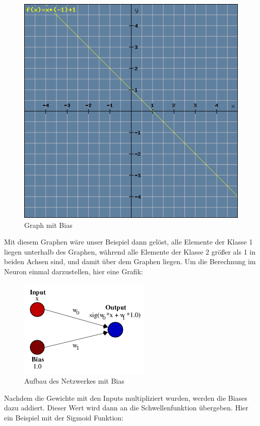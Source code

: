 \documentclass[12pt]{article}
\begin{document}
\begin{figure}[H]
\centering
\includegraphics[scale=0.60]{./Images/Pasted image 20231005144628.png}
\caption{Graph mit Bias}
\label{Graph mit Bias}
\end{figure}
Mit diesem Graphen wäre unser Beispiel dann gelöst, alle Elemente der Klasse 1 liegen unterhalb des Graphen, während alle Elemente der Klasse 2 größer als 1 in beiden Achsen sind, und damit über dem Graphen liegen.
Um die Berechnung im Neuron einmal darzustellen, hier eine Grafik:
\begin{figure}[H]
\centering
\includegraphics[scale=0.60]{./Images/Pasted image 20231005133406.png}
\caption{Aufbau des Netzwerkes mit Bias}
\label{Aufbau des Netzwerkes mit Bias}
\end{figure}
Nachdem die Gewichte mit den Inputs multipliziert wurden, werden die Biases dazu addiert. Dieser Wert wird dann an die Schwellenfunktion übergeben. Hier ein Beispiel mit der Sigmoid Funktion:
\end{document}
